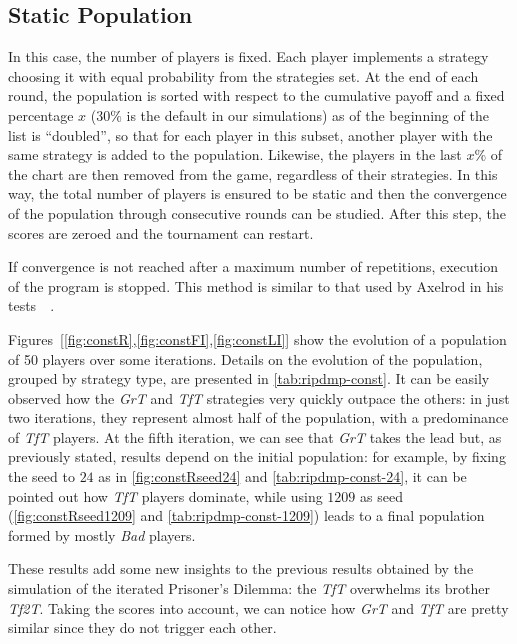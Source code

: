 \documentclass[journal,10pt,twoside]{IEEEtran}
\begin{document}
\subsection{Static Population} \label{ss:rIPDMPc}
In this case, the number of players is fixed. Each player implements a strategy choosing it with equal probability from the strategies set. At the end of each round, the population is sorted with respect to the cumulative payoff and a fixed percentage $x$ ($30\%$ is the default in our simulations) as of the beginning of the list is ``doubled'', so that for each player in this subset, another player with the same strategy is added to the population. Likewise, the players in the last $x\%$ of the chart are then removed from the game, regardless of their strategies. In this way, the total number of players is ensured to be static and then the convergence of the population through consecutive rounds can be studied. After this step, the scores are zeroed and the tournament can restart.

If convergence is not reached after a maximum number of repetitions, execution of the program is stopped.
This method is similar to that used by Axelrod in his tests~\cite[\S 2.6]{mathieu2017}~\cite{axelrod1984evolution}.

Figures~[\ref{fig:constR},\ref{fig:constFI},\ref{fig:constLI}] show the evolution of a population of 50 players over some iterations.
Details on the evolution of the population, grouped by strategy type, are presented in \autoref{tab:ripdmp-const}.
It can be easily observed how the \textit{GrT} and \textit{TfT} strategies very quickly outpace the others: in just two iterations, they represent almost half of the population, with a predominance of \textit{TfT} players. At the fifth iteration, we can see that \textit{GrT} takes the lead but, as previously stated, results depend on the initial population: for example, by fixing the seed to $24$ as in \autoref{fig:constRseed24} and \autoref{tab:ripdmp-const-24}, it can be pointed out how \textit{TfT} players dominate, while using $1209$ as seed (\autoref{fig:constRseed1209} and \autoref{tab:ripdmp-const-1209}) leads to a final population formed by mostly \textit{Bad} players.

These results add some new insights to the previous results obtained by the simulation of the iterated Prisoner's Dilemma: the \textit{TfT} overwhelms its brother \textit{Tf2T}. Taking the scores into account, we can notice how \textit{GrT} and \textit{TfT} are pretty similar since they do not trigger each other.
\end{document}
